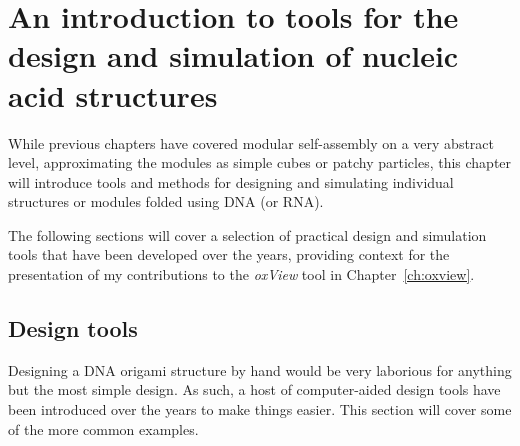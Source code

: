 
\chapter{\label{ch:oxview_intro}An introduction to tools for the design and simulation of nucleic acid structures}

\minitoc

While previous chapters have covered modular self-assembly on a very abstract level, approximating the modules as simple cubes or patchy particles, this chapter will introduce tools and methods for designing and simulating individual structures or modules folded using DNA (or RNA).

The following sections will cover a selection of practical design and simulation tools that have been developed over the years, providing context for the presentation of my contributions to the \emph{oxView} tool in Chapter~\ref{ch:oxview}.







\section{Design tools}\label{sec:design_tools}
Designing a DNA origami structure by hand would be very laborious for anything but the most simple design. As such, a host of computer-aided design tools have been introduced over the years to make things easier. This section will cover some of the more common examples.

